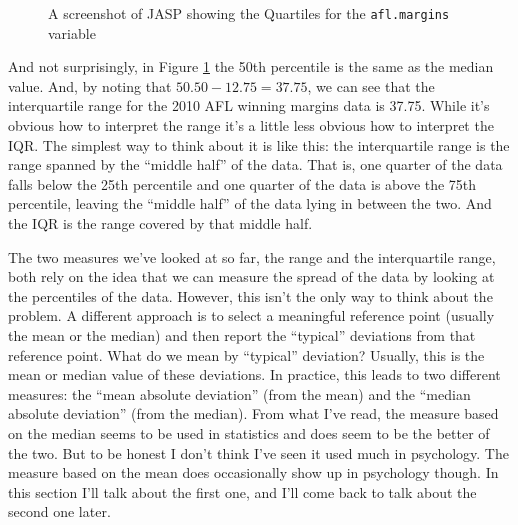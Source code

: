 \begin{figure}[htb]
\begin{center}
\caption{A screenshot of JASP showing the Quartiles for the \texttt{afl.margins} variable }
\label{fig:aflsmall_margins_iqr}
\HR
\end{center}
\end{figure}

And not surprisingly, in Figure \ref{fig:aflsmall_margins_iqr} the 50th percentile is the same as the median value. And, by noting that $50.50 - 12.75 = 37.75$, we can see that the interquartile range for the 2010 AFL winning margins data is 37.75. While it's obvious how to interpret the range it's a little less obvious how to interpret the IQR. The simplest way to think about it is like this: the interquartile range is the range spanned by the ``middle half'' of the data. That is, one quarter of the data falls below the 25th percentile and one quarter of the data is above the 75th percentile, leaving the ``middle half'' of the data lying in between the two. And the IQR is the range covered by that middle half.


The two measures we've looked at so far, the range and the interquartile range, both rely on the idea that we can measure the spread of the data by looking at the percentiles of the data. However, this isn't the only way to think about the problem. A different approach is to select a meaningful reference point (usually the mean or the median) and then report the ``typical'' deviations from that reference point. What do we mean by ``typical'' deviation? Usually, this is the mean or median value of these deviations. In practice, this leads to two different measures: the ``mean absolute deviation'' (from the mean) and the ``median absolute deviation'' (from the median). From what I've read, the measure based on the median seems to be used in statistics and does seem to be the better of the two. But to be honest I don't think I've seen it used much in psychology. The measure based on the mean does occasionally show up in psychology though. In this section I'll talk about the first one, and I'll come back to talk about the second one later.

